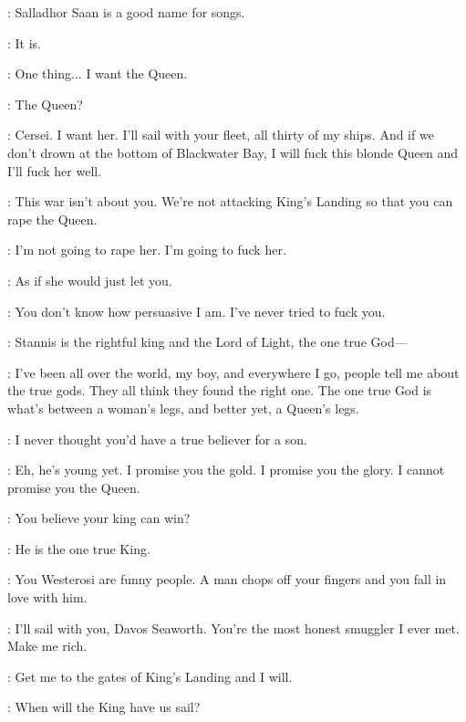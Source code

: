 \SALLADHOR: Salladhor Saan is a good name for songs.

\DAVOS: It is.

\SALLADHOR: One thing$\ldots$ I want the Queen.

\DAVOS: The Queen?

\SALLADHOR: Cersei. I want her. I'll sail with your fleet, all thirty of my ships. And if we don't drown at the bottom of Blackwater Bay, I will fuck this blonde Queen and I'll fuck her well.

\MATTHOS: This war isn't about you. We're not attacking King's Landing so that you can rape the Queen.

\SALLADHOR: I'm not going to rape her. I'm going to fuck her.

\MATTHOS: As if she would just let you.

\SALLADHOR: You don't know how persuasive I am. I've never tried to fuck you.

\MATTHOS: Stannis is the rightful king and the Lord of Light, the one true God---

\SALLADHOR: I've been all over the world, my boy, and everywhere I go, people tell me about the true gods. They all think they found the right one. The one true God is what's between a woman's legs, and better yet, a Queen's legs.


\SALLADHOR: I never thought you'd have a true believer for a son.

\DAVOS: Eh, he's young yet. I promise you the gold. I promise you the glory. I cannot promise you the Queen.

\SALLADHOR: You believe your king can win?

\DAVOS: He is the one true King.

\SALLADHOR: You Westerosi are funny people. A man chops off your fingers and you fall in love with him.


\SALLADHOR: I'll sail with you, Davos Seaworth. You're the most honest smuggler I ever met. Make me rich.

\DAVOS: Get me to the gates of King's Landing and I will.


\MATTHOS: When will the King have us sail?

